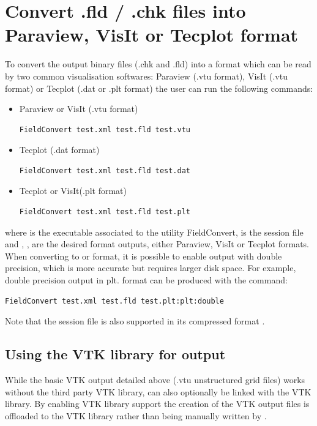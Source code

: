 \section{Convert .fld / .chk files into Paraview, VisIt or Tecplot format}
\label{s:utilities:fieldconvert:sub:convert}
To convert the \nekpp output binary files (.chk and .fld) into a
format which can be read by two common visualisation softwares:
Paraview (.vtu format), VisIt (.vtu format) or Tecplot (.dat or .plt format)
the user can run the following commands:
%
\begin{itemize}
\item Paraview or VisIt (.vtu format)
%
\begin{lstlisting}[style=BashInputStyle]
FieldConvert test.xml test.fld test.vtu
\end{lstlisting}
%
\item Tecplot (.dat format)
%
\begin{lstlisting}[style=BashInputStyle]
FieldConvert test.xml test.fld test.dat
\end{lstlisting}
%
\item Tecplot or VisIt(.plt format)
%
\begin{lstlisting}[style=BashInputStyle]
FieldConvert test.xml test.fld test.plt
\end{lstlisting}
\end{itemize}
%
where  is the executable associated to the utility
FieldConvert,  is the session file and
, ,   are the desired
format outputs, either Paraview, VisIt or Tecplot formats. \\
When converting to  or  format, it is possible to
enable output with double precision, which is more accurate but requires larger
disk space. For example, double precision output in plt. format can be produced
with the command:
\begin{lstlisting}[style=BashInputStyle]
FieldConvert test.xml test.fld test.plt:plt:double
\end{lstlisting}
%
\begin{tipbox}
Note that the session file is also supported
in its compressed format .
\end{tipbox}
%
\subsection{Using the VTK library for output}
While the basic VTK output detailed above (.vtu unstructured grid files) works
without the third party VTK library, \nekpp can also optionally be linked with
the VTK library. By enabling VTK  library support the creation of the VTK output
files is offloaded to the VTK library rather than being manually written by \nekpp.

